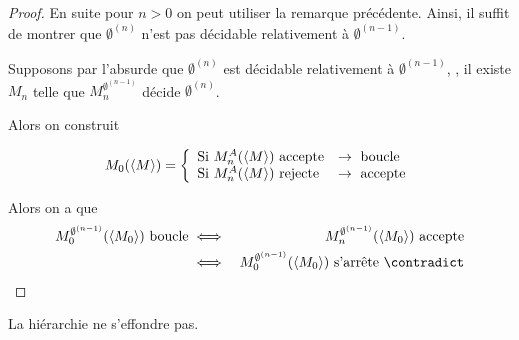 \begin{proof}
	En suite pour $n > 0$ on peut utiliser la remarque précédente. Ainsi, il suffit de montrer que $\emptyset^{(n)}$ n'est pas décidable relativement à $\emptyset^{(n-1)}$.

	Supposons par l'absurde que $\emptyset^{(n)}$ est décidable relativement à $\emptyset^{(n-1)}$, \ie, il existe $M_n$ telle que $M_n^{\emptyset^{(n-1)}}$ décide $\emptyset^{(n)}$.

	Alors on construit

	$$
		M_0(\left\langle M\right\rangle) =
		\left\{
		\begin{array}{ll}
			\text{Si } M_n^A(\left\langle M\right\rangle) \text{ accepte} & \rightarrow \text{ boucle}  \\
			\text{Si } M_n^A(\left\langle M\right\rangle) \text{ rejecte} & \rightarrow \text{ accepte} \\
		\end{array}
		\right.
	$$

	Alors on a que
	\begin{eqnarray*}
		M_0^{\emptyset^{(n-1)}}(\encode{M_0}) \text{ boucle} &\iff& M_n^{\emptyset^{(n-1)}} (\encode {M_0}) \text{ accepte} \\
		&\iff& M_0^{\emptyset^{(n-1)}}(\encode{M_0}) \text{ s'arrête} \ \contradict
	\end{eqnarray*}
\end{proof}


\begin{coro}
	La hiérarchie ne s'effondre pas.
\end{coro}
